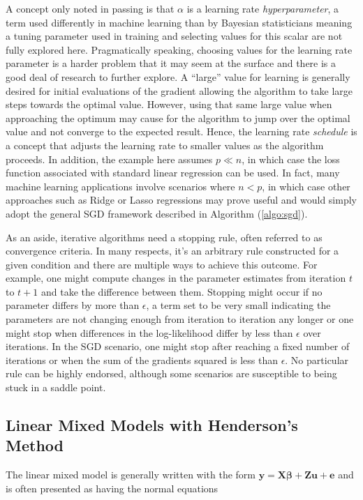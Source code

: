 \documentclass[12pt]{article}
\begin{document}
A concept only noted in passing is that $\alpha$ is a learning rate \textit{hyperparameter}, a term used differently in machine learning than by Bayesian statisticians meaning a tuning parameter used in training and selecting values for this scalar are not fully explored here. Pragmatically speaking, choosing values for the learning rate parameter is a harder problem that it may seem at the surface and there is a good deal of research to further explore. A ``large'' value for learning is generally desired for initial evaluations of the gradient allowing the algorithm to take large steps towards the optimal value. However, using that same large value when approaching the optimum may cause for the algorithm to jump over the optimal value and not converge to the expected result. Hence, the learning rate \textit{schedule} is a concept that adjusts the learning rate to smaller values as the algorithm proceeds. In addition, the example here assumes $p \ll n$, in which case the loss function associated with standard linear regression can be used. In fact, many machine learning applications involve scenarios where $n < p$, in which case other approaches such as Ridge or Lasso regressions may prove useful and would simply adopt the general SGD framework described in Algorithm (\ref{algo:sgd}). 

As an aside, iterative algorithms need a stopping rule, often referred to as convergence criteria. In many respects, it's an arbitrary rule constructed for a given condition and there are multiple ways to achieve this outcome. For example, one might compute changes in the parameter estimates from iteration $t$ to $t+1$ and take the difference between them. Stopping might occur if no parameter differs by more than $\epsilon$, a term set to be very small indicating the parameters are not changing enough from iteration to iteration any longer or one might stop when differences in the log-likelihood differ by less than $\epsilon$ over iterations. In the SGD scenario, one might stop after reaching a fixed number of iterations or when the sum of the gradients squared is less than $\epsilon$. No particular rule can be highly endorsed, although some scenarios are susceptible to being stuck in a saddle point. 

\subsection*{Linear Mixed Models with Henderson's Method}

The linear mixed model is generally written with the form $\bm{y} = \bm{X}\bm{\beta} + \bm{Z}\bm{u} + \bm{e}$ \cite{laird:ware} and is often presented as having the normal equations \cite{henderson}
\end{document}
